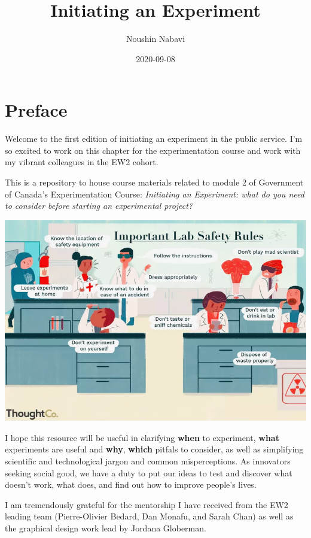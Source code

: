 \documentclass[]{book}
\title{Initiating an Experiment}
\author{Noushin Nabavi}
\date{2020-09-08}
\begin{document}
\maketitle

{
\setcounter{tocdepth}{1}
\tableofcontents
}
\hypertarget{preface}{%
\chapter*{Preface}\label{preface}}

Welcome to the first edition of initiating an experiment in the public service. I'm so excited to work on this chapter for the experimentation course and work with my vibrant colleagues in the EW2 cohort.

This is a repository to house course materials related to module 2 of Government of Canada's Experimentation Course: \emph{Initiating an Experiment: what do you need to consider before starting an experimental project?}

\includegraphics{fig/experimentation-rules.png}

I hope this resource will be useful in clarifying \textbf{when} to experiment, \textbf{what} experiments are useful and \textbf{why}, \textbf{which} pitfals to consider, as well as simplifying scientific and technological jargon and common misperceptions. As innovators seeking social good, we have a duty to put our ideas to test and discover what doesn't work, what does, and find out how to improve people's lives.

I am tremendously grateful for the mentorship I have received from the EW2 leading team (Pierre-Olivier Bedard, Dan Monafu, and Sarah Chan) as well as the graphical design work lead by Jordana Globerman.
\end{document}
